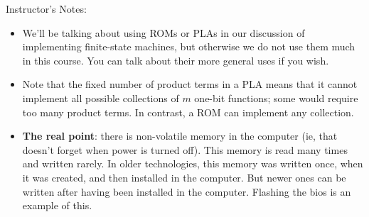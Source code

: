 %     

\BNotes\ifnum{}
\begin{frame}[fragile]
Instructor's Notes:
\begin{itemize}
\item We'll be talking about using ROMs or PLAs in our discussion of
implementing finite-state machines, but otherwise we do not use them
much in this course. You can talk about their more general uses if you
wish. 
\item Note that the fixed number of product terms in a PLA means that
it cannot implement all possible collections of $m$ one-bit functions;
some would require too many product terms. In contrast, a ROM can implement
any collection.
\bigskip
\item {\bf The real point}: there is non-volatile memory in the computer (ie, that doesn't forget when power is turned off).  This memory is read many times and written rarely.  In older technologies, this memory was written once, when it was created, and then installed in the computer.  But newer ones can be written after having been installed in the computer.  Flashing the bios is an example of this.
\end{itemize}
\end{frame}
\fi\ENotes

